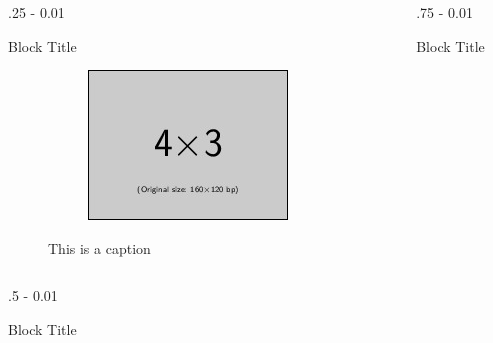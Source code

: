 \documentclass{postertheme}\usepackage[]{graphicx}\usepackage[]{color}
\begin{document}
\begin{frame}
\begin{columns}[onlytextwidth]
\begin{column}{.25 \textwidth - 0.01 \textwidth}
\begin{block}{Block Title}
\begin{figure}
\begin{minipage}{\linewidth}
\begin{minipage}{0.49 \linewidth}
          \begin{figure}
            \includegraphics[scale=1]{figures/example-image-4x3.jpg}
          \end{figure}
        \end{minipage}
      \end{minipage}
      
    \vskip0.25in
    \caption{This is a caption}
    \end{figure}
    \end{block}
  \end{column}

  \begin{column}{.75 \textwidth - 0.01 \textwidth}
    \begin{block}{Block Title}
      \lipsum[4-5]
    \end{block}
  \end{column}

\end{columns}


\begin{columns}[onlytextwidth]
  
  \begin{column}{.5 \textwidth - 0.01 \textwidth}
    \begin{block}{Block Title}
    \begin{figure}


\end{figure}
\end{block}
\end{column}
\end{columns}
\end{frame}
\end{document}
